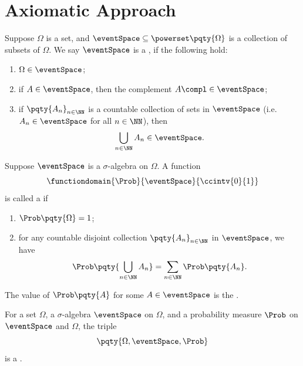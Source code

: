 \section{Axiomatic Approach}

\begin{definition}
    \label{def:sigma-algebra}%
    Suppose \(\Omega\) is a set, and \(\eventSpace \subseteq \powerset\pqty{\Omega}\) is a collection of subsets of \(\Omega\). We say \(\eventSpace\) is a , if the following hold:
    \begin{enumerate}
        \item \(\Omega \in \eventSpace\);
        \item if \(A \in \eventSpace\), then the complement \(A\compl \in \eventSpace\);
        \item if \(\pqty{A_n}_{n \in \NN}\) is a countable collection of sets in \(\eventSpace\) (i.e. \(A_n \in \eventSpace\) for all \(n \in \NN\)), then
        \[
            \bigcup_{n \in \NN} A_n \in \eventSpace.
        \]
    \end{enumerate}
\end{definition}

\begin{definition}
    \label{def:probability-measure}%
    Suppose \(\eventSpace\) is a \(\sigma\)-algebra on \(\Omega\). A function
    \[
        \functiondomain{\Prob}{\eventSpace}{\ccintv{0}{1}}
    \]
    is called a  if
    \begin{enumerate}
        \item \(\Prob\pqty{\Omega} = 1\);
        \item for any countable disjoint collection \(\pqty{A_n}_{n \in \NN}\) in \(\eventSpace\), we have
        \[
            \Prob\pqty{\bigcup_{n \in \NN} A_n} = \sum_{n \in \NN} \Prob\pqty{A_n}.
        \]
    \end{enumerate}

    The value of \(\Prob\pqty{A}\) for some \(A \in \eventSpace\) is the .
\end{definition}

\begin{definition}
    \label{def:probability-space}%
    For a set \(\Omega\), a \(\sigma\)-algebra \(\eventSpace\) on \(\Omega\), and a probability measure \(\Prob\) on \(\eventSpace\) and \(\Omega\), the triple
    \[
        \pqty{\Omega, \eventSpace, \Prob}
    \]
    is a .
\end{definition}

